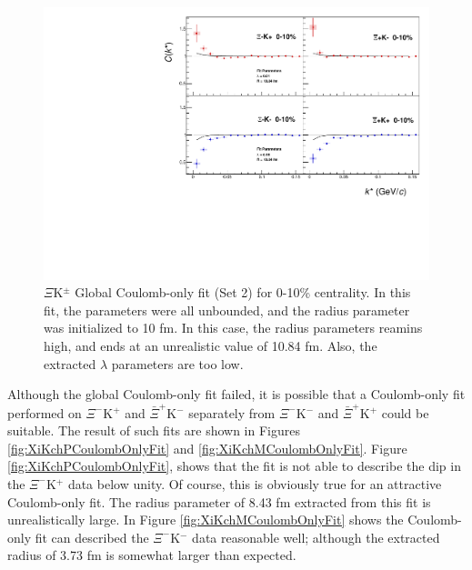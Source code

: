 \documentclass[../AnalysisNoteJBuxton.tex]{subfiles}
\begin{document}
\begin{figure}[h]
  \centering
  \includegraphics[width=\textwidth]{7_ResultsAndDiscussion/Figures/GlobalCoulombOnlyFit_Set2.pdf}
  \caption[$\Xi$K$^{\pm}$ Global Coulomb-Only Fit (Set 2)]{$\Xi$K$^{\pm}$ Global Coulomb-only fit (Set 2) for 0-10\% centrality.  In this fit, the parameters were all unbounded, and the radius parameter was initialized to 10 fm.  In this case, the radius parameters reamins high, and ends at an unrealistic value of 10.84 fm.  Also, the extracted $\lambda$ parameters are too low.}
  \label{fig:XiKchGlobalCoulombOnlySet2}
\end{figure}

Although the global Coulomb-only fit failed, it is possible that a Coulomb-only fit performed on $\Xi^{-}$K$^{+}$ and $\bar{\Xi}^{+}$K$^{-}$ separately from $\Xi^{-}$K$^{-}$ and $\bar{\Xi}^{+}$K$^{+}$ could be suitable.  The result of such fits are shown in Figures \ref{fig:XiKchPCoulombOnlyFit} and \ref{fig:XiKchMCoulombOnlyFit}.  Figure \ref{fig:XiKchPCoulombOnlyFit}, shows that the fit is not able to describe the dip in the $\Xi^{-}$K$^{+}$ data below unity.  Of course, this is obviously true for an attractive Coulomb-only fit.  The radius parameter of 8.43 fm extracted from this fit is unrealistically large.  In Figure \ref{fig:XiKchMCoulombOnlyFit} shows the Coulomb-only fit can described the $\Xi^{-}$K$^{-}$ data reasonable well; although the extracted radius of 3.73 fm is somewhat larger than expected.
\end{document}

